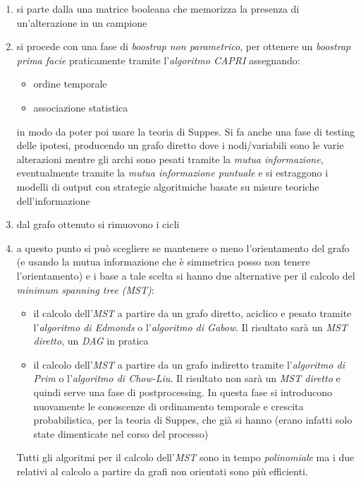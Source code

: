 \documentclass[a4paper,12pt, oneside]{book}
\begin{document}
\begin{enumerate}
  \item si parte dalla una matrice booleana che memorizza la presenza di
  un'alterazione in un campione  
  \item si procede con una fase di \textit{boostrap non parametrico}, per
  ottenere un \textit{boostrap prima facie} praticamente tramite
  l'\textit{algoritmo CAPRI} assegnando: 
  \begin{itemize}
    \item ordine temporale
    \item associazione statistica
  \end{itemize}
  in modo da poter poi usare la teoria di Suppes. Si fa anche una fase di
  testing delle ipotesi, producendo un grafo diretto 
  dove i nodi/variabili sono le varie alterazioni mentre gli archi sono pesati
  tramite la \textit{mutua informazione}, eventualmente tramite la \textit{mutua
    informazione puntuale} e si estraggono i modelli di output con strategie
  algoritmiche basate su misure teoriche dell'informazione
  \item dal grafo ottenuto si rimuovono i cicli
  \item a questo punto si può scegliere se mantenere o meno l'orientamento del
  grafo (e usando la mutua informazione che è simmetrica posso non tenere
  l'orientamento) e i base a tale scelta si hanno due alternative per il calcolo
  del \textit{minimum spanning tree (MST)}:
  \begin{itemize}
    \item il calcolo dell'\textit{MST} a partire da un grafo diretto, aciclico e
    pesato tramite l'\textit{algoritmo di Edmonds} o l'\textit{algoritmo di
      Gabow}. Il risultato sarà un \textit{MST diretto}, un \textit{DAG} in
    pratica 
     \item il calcolo dell'\textit{MST} a partire da un grafo indiretto tramite
     l'\textit{algoritmo di Prim} o l'\textit{algoritmo di Chow-Liu}. Il
     risultato non sarà un \textit{MST diretto} e quindi serve una fase di
     postprocessing. In questa fase si introducono nuovamente le conoscenze di
     ordinamento temporale e crescita probabilistica, per la teoria di Suppes,
     che già si hanno (erano infatti solo state dimenticate nel corso del
     processo) 
   \end{itemize}
   Tutti gli algoritmi per il calcolo dell'\textit{MST} sono in tempo
   \textit{polinomiale} ma i due relativi al calcolo a partire da grafi non
   orientati sono più efficienti.
 \end{enumerate}
\end{document}
